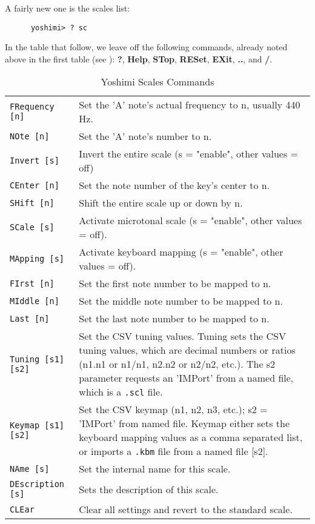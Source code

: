    A fairly new one is the scales list:

   \begin{verbatim}
      yoshimi> ? sc
   \end{verbatim}

   In the table that follow, we leave off the following commands, already noted
   above in the first table
   (see ):
   \textbf{?}, \textbf{Help}, \textbf{STop}, \textbf{RESet},
   \textbf{EXit}, \textbf{..}, and \textbf{/}.

\begin{center}
\begin{longtable}{p{4cm} p{10cm}}
\caption[Yoshimi Scales Commands]{Yoshimi Scales Commands} \\

\texttt{FRequency [n]} &
   Set the 'A' note's actual frequency to n, usually 440 Hz. \\
\texttt{NOte [n]} &
   Set the 'A' note's number to n. \\
\texttt{Invert [s]} &
   Invert the entire scale (s = "enable", other values = off) \\
\texttt{CEnter [n]} &
   Set the note number of the key's center to n. \\
\texttt{SHift [n]} &
   Shift the entire scale up or down by n. \\
\texttt{SCale [s]} &
   Activate microtonal scale (s = "enable", other values = off). \\
\texttt{MApping [s]} &
   Activate keyboard mapping (s = "enable", other values = off). \\
\texttt{FIrst [n]} &
   Set the first note number to be mapped to n. \\
\texttt{MIddle [n]} &
   Set the middle note number to be mapped to n. \\
\texttt{Last [n]} &
   Set the last note number to be mapped to n. \\
\texttt{Tuning [s1] [s2]} &
   Set the CSV tuning values.
   Tuning sets the CSV tuning values, which are decimal numbers or ratios
   (n1.n1 or n1/n1, n2.n2 or n2/n2, etc.).
   The s2 parameter requests an 'IMPort' from a named file, which is
   \index{.scl}
   \index{config!.scl}
   a \texttt{.scl} file. \\
\texttt{Keymap [s1] [s2]} &
   Set the CSV keymap (n1, n2, n3, etc.); s2 = 'IMPort' from named file.
   Keymap either sets the keyboard mapping values as a comma separated list, or
   imports a
   \index{.kbm}
   \index{config!.kbm}
   \texttt{.kbm} file from a named file [s2]. \\
\texttt{NAme [s]} &
   Set the internal name for this scale. \\
\texttt{DEscription [s]} &
   Sets the description of this scale. \\
\texttt{CLEar} &
   Clear all settings and revert to the standard scale. \\
\end{longtable}
\end{center}


